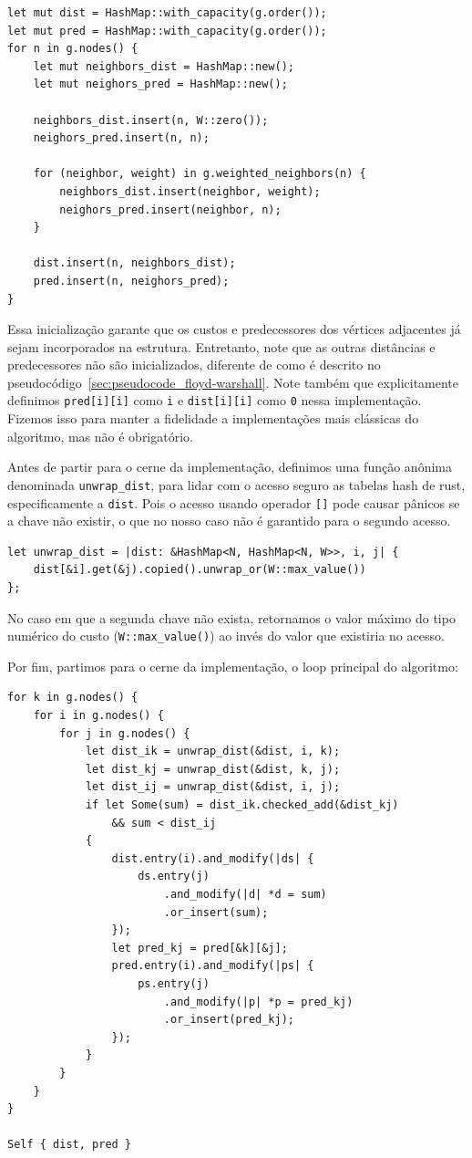 \begin{verbatim}
let mut dist = HashMap::with_capacity(g.order());
let mut pred = HashMap::with_capacity(g.order());
for n in g.nodes() {
    let mut neighbors_dist = HashMap::new();
    let mut neighors_pred = HashMap::new();

    neighbors_dist.insert(n, W::zero());
    neighors_pred.insert(n, n);

    for (neighbor, weight) in g.weighted_neighbors(n) {
        neighbors_dist.insert(neighbor, weight);
        neighors_pred.insert(neighbor, n);
    }

    dist.insert(n, neighbors_dist);
    pred.insert(n, neighors_pred);
}
\end{verbatim}

Essa inicialização garante que os custos e predecessores dos vértices
adjacentes já sejam incorporados na estrutura. Entretanto, note que
as outras distâncias e predecessores não são inicializados, diferente
de como é descrito no
pseudocódigo~\ref{sec:pseudocode_floyd-warshall}. Note também que
explicitamente definimos \texttt{pred[i][i]} como \texttt{i} e
\texttt{dist[i][i]} como \texttt{0} nessa implementação. Fizemos isso
para manter a fidelidade a implementações mais clássicas do
algoritmo, mas não é obrigatório.

Antes de partir para o cerne da implementação, definimos uma função
anônima denominada \texttt{unwrap\_dist}, para lidar com o acesso
seguro as tabelas hash de rust, especificamente a \texttt{dist}. Pois
o acesso usando operador \texttt{[]} pode causar pânicos se a chave
não existir, o que no nosso caso não é garantido para o segundo acesso.

\begin{verbatim}
let unwrap_dist = |dist: &HashMap<N, HashMap<N, W>>, i, j| {
    dist[&i].get(&j).copied().unwrap_or(W::max_value())
};
\end{verbatim}

No caso em que a segunda chave não exista, retornamos o valor máximo do tipo
numérico do custo (\texttt{W::max\_value()}) ao invés do valor que
existiria no acesso.

Por fim, partimos para o cerne da implementação, o loop principal do algoritmo:

\begin{verbatim}
for k in g.nodes() {
    for i in g.nodes() {
        for j in g.nodes() {
            let dist_ik = unwrap_dist(&dist, i, k);
            let dist_kj = unwrap_dist(&dist, k, j);
            let dist_ij = unwrap_dist(&dist, i, j);
            if let Some(sum) = dist_ik.checked_add(&dist_kj)
                && sum < dist_ij
            {
                dist.entry(i).and_modify(|ds| {
                    ds.entry(j)
                        .and_modify(|d| *d = sum)
                        .or_insert(sum);
                });
                let pred_kj = pred[&k][&j];
                pred.entry(i).and_modify(|ps| {
                    ps.entry(j)
                        .and_modify(|p| *p = pred_kj)
                        .or_insert(pred_kj);
                });
            }
        }
    }
}

Self { dist, pred }
\end{verbatim}

